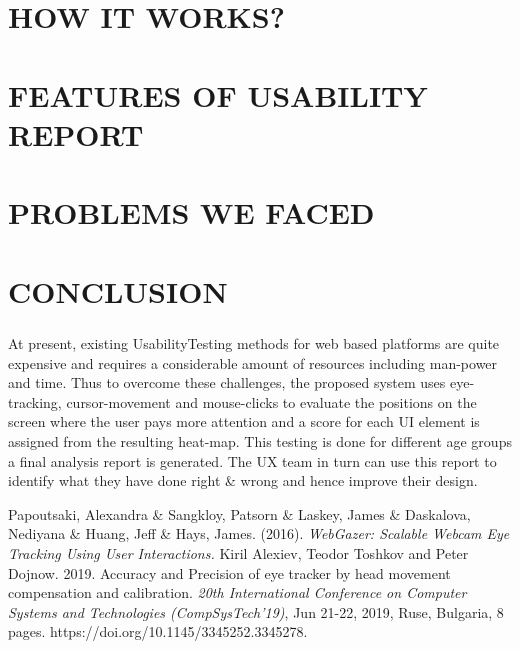\documentclass[12pt,a4paper,final]{extreport}
\begin{document}
\newpage
\chapter{HOW IT WORKS?}


\newpage
\chapter{FEATURES OF USABILITY REPORT}

\newpage
\chapter{PROBLEMS WE FACED}

\newpage
\chapter{CONCLUSION }
\paragraph{}
At present, existing Usability\-Testing methods for web based platforms are quite expensive and requires a considerable amount of resources including man-power and time.
Thus to overcome these challenges, the proposed system uses eye-tracking, cursor-movement and mouse-clicks to evaluate the positions on the screen where the user pays more attention and a score for each UI element is assigned from the resulting heat-map.
This testing is done for different age groups a final analysis report is generated. The UX team in turn can use this report to identify what they have done right \& wrong and hence improve their design.

\newpage
{}
\vspace{0.3cm}
\begin{thebibliography}{}
    Papoutsaki, Alexandra \& Sangkloy, Patsorn \& Laskey, James \& Daskalova, Nediyana \& Huang, Jeff \& Hays, James. (2016). \emph{WebGazer: Scalable Webcam Eye Tracking Using User Interactions.}
    Kiril Alexiev, Teodor Toshkov and Peter Dojnow. 2019. Accuracy and Precision of eye tracker by head movement compensation and calibration. \emph{20th International Conference on Computer Systems and Technologies
    (CompSysTech'19)}, Jun 21-22, 2019, Ruse, Bulgaria, 8 pages.
    https://doi.org/10.1145/3345252.3345278.

\end{thebibliography}
\end{document}
